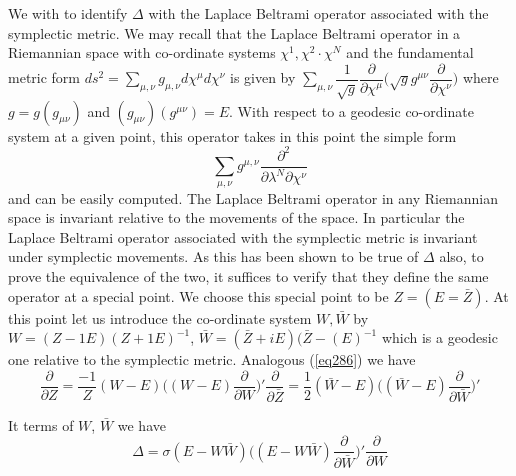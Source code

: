 We with to identify $\Delta$ with the Laplace Beltrami operator
associated with the symplectic metric. We may recall that the Laplace
Beltrami operator in a Riemannian space with co-ordinate systems
$\chi^1, \chi^2 \cdot \chi^N$ and the fundamental metric form $ds^2 =
\sum\limits_{\mu, \nu} g_{\mu , \nu} d \chi^\mu d \chi^\nu $ is given
by $\sum\limits_{\mu, \nu } \dfrac{1}{\sqrt{g}}
\dfrac{\partial}{\partial \chi^\mu} \bigg(\sqrt{g}  g^{\mu \nu}
\dfrac{\partial}{\partial \chi^\nu} \bigg)$ where\pageoriginale $g =
g(g_{\mu \nu})$ and $(g_{\mu \nu}) (g^{\mu \nu}) = E$. With respect to
a geodesic co-ordinate system at a given point, this operator takes in
this point the simple form  
\begin{equation*}
\sum_{\mu, \nu} g^{\mu, \nu} \frac{\partial^2}{\partial \lambda^N
  \partial \chi^\nu}  \tag{290}\label{eq290}    
\end{equation*}
and can be easily computed. The Laplace Beltrami operator in any
Riemannian space is invariant relative to the movements of the
space. In particular the Laplace Beltrami operator associated with the
symplectic metric is invariant under symplectic movements. As this has
been shown to be true of $\Delta$ also, to prove the equivalence of
the two, it suffices to verify that they define the same operator at
a special point. We choose this special point to be $Z = ( E =
\bar{Z})$. At this point let us introduce the co-ordinate system $W,
\bar{W}$ by $W = (Z - 1 E) (Z + 1 E)^{-1}$, $\bar{W} = (\bar{Z} + i E )
(\bar{Z} - (E)^{-1}$ which is a geodesic one relative to the
symplectic metric. Analogous (\ref{eq286}) we have 
\begin{equation*}
\frac{\partial}{\partial Z} = \frac{-1}{Z} (W-E) \bigg( (W -E)
\frac{\partial}{\partial W} \bigg)' \frac{\partial}{\partial \bar{Z}}
= \frac{1}{2} (\bar{W} - E) \bigg((\bar{W} -E)
\frac{\partial}{\partial \bar{W}} \bigg)' \tag{291}\label{eq291}     
\end{equation*}

It terms of $W$, $\bar{W}$ we have
$$
\Delta = \sigma (E - W \bar{W}) \bigg((E - W \bar{W})
\frac{\partial}{\partial \bar{W}} \bigg)' \frac{\partial}{\partial W} 
$$

